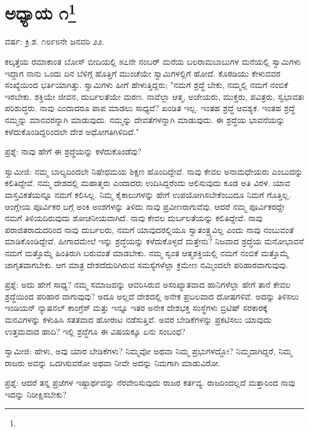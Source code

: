 
\chapter[ಅಧ್ಯಾಯ ೧]{ಅಧ್ಯಾಯ ೧\protect\footnote{}}

\begin{center}
ವರ್ಷ: ಕ್ರಿ.ಶ. ೧೮೯೮ನೇ ಜನವರಿ ೨೨.
\end{center}

ಕಲ್ಕತ್ತೆಯ ರಮಾಕಾಂತ ಬೋಸ್ ಬೀದಿಯಲ್ಲಿ ೫೭ನೇ ನಂಬರ್‌ ಮನೆಯ ಬಲರಾಮಬಾಬುಗಳ ಮನೆಯಲ್ಲಿ ಸ್ವಾಮಿಗಳು ಇದ್ದಾಗ ನಾನು ಒಂದು ದಿನ ಬೆಳಿಗ್ಗೆ ಹೊತ್ತಿಗೆ ಮುಂಚೆಯೇ ಸ್ವಾಮಿಗಳಲ್ಲಿಗೆ ಹೋದೆ. ಕೊಠಡಿಯು ಕೇಳುವವರ ಸಂಖ್ಯೆಯಿಂದ ಭರ್ತಿಯಾಗಿತ್ತು. ಸ್ವಾಮಿಗಳು ಹೀಗೆ ಹೇಳುತ್ತಿದ್ದರು; "ನಮಗೆ ಶ್ರದ್ಧೆ ಬೇಕು, ನಮ್ಮಲ್ಲಿ ನಮಗೆ ನಂಬಿಕೆ ಇರಬೇಕು. ಶಕ್ತಿಯೇ ಜೀವನ, ದುರ್ಬಲತೆಯೇ ಮರಣ. ನಾವೆಲ್ಲಾ ಆತ್ಮ, ಅಜೇಯರು, ಮುಕ್ತರು, ಪವಿತ್ರರು, ಸ್ವಭಾವತಃ ಪರಿಶುದ್ಧರು. ನಾವು ಎಂದಾದರೂ ಪಾಪ ಮಾಡಲು ಸಾಧ್ಯವೆ? ಖಂಡಿತ ಇಲ್ಲ. ಇಂತಹ ಶ್ರದ್ಧೆ ಆವಶ್ಯಕ. ಇಂತಹ ಶ್ರದ್ಧೆ ನಮ್ಮನ್ನು ಮಾನವರನ್ನಾಗಿ ಮಾಡುವುದು. ನಮ್ಮನ್ನು ದೇವತೆಗಳನ್ನಾಗಿ ಮಾಡುವುದು. ಈ ಶ್ರದ್ಧೆಯ ಭಾವನೆಯನ್ನು ಕಳೆದುಕೊಂಡಿದ್ದರಿಂದಲೇ ದೇಶ ಅಧೋಗತಿಗಿಳಿದಿದೆ."

ಪ್ರಶ್ನೆ: ನಾವು ಹೇಗೆ ಈ ಶ್ರದ್ಧೆಯನ್ನು ಕಳೆದುಕೊಂಡೆವು?

ಸ್ವಾಮೀಜಿ: ನಮ್ಮ ಬಾಲ್ಯದಿಂದಲೇ ನಿಷೇಧಮಯ ಶಿಕ್ಷಣ ಹೊಂದಿದ್ದೇವೆ. ನಾವು ಕೇವಲ ಅನಾಮಧೇಯರು ಎಂಬುದನ್ನು ಕಲಿತಿದ್ದೇವೆ. ನಮ್ಮ ದೇಶದಲ್ಲಿ ಮಹಾತ್ಮರು ಎಂದಾದರು ಉದಿಸಿದ್ದರೆಂದು ಆಲಿಸುವುದು ಕೂಡ ಅತಿ ವಿರಳ. ಯಾವ ವಾಸ್ತವಿಕತೆಯನ್ನೂ ನಮಗೆ ಕಲಿಸಿಲ್ಲ. ನಿಮ್ಮ ಕೈಕಾಲುಗಳನ್ನು ಹೇಗೆ ಉಪಯೋಗಿಸಬೇಕೆಂಬುದೂ ನಿಮಗೆ ಗೊತ್ತಿಲ್ಲ. ಆಂಗ್ಲೇಯ ಪೂರ್ವಿಕರ ಬಗ್ಗೆ ಅಂಕಿ ಅಂಶಗಳನ್ನು ತಿಳಿದು ನಾವು ಪ್ರವೀಣರಾಗುವೆವು. ಆದರೆ ನಮ್ಮ ಪೂರ್ವಿಕರದ್ದೇ ನಮಗೆ ತಿಳಿಯದಿರುವುದು ಶೋಚನೀಯವಾಗಿದೆ. ನಾವು ಕೇವಲ ದುರ್ಬಲತೆಯನ್ನು ಕಲಿತಿದ್ದೇವೆ. ನಾವು ಪರಾಜಿತರಾದುದರಿಂದ ನಾವು ದುರ್ಬಲರು, ನಮಗೆ ಯಾವುದರಲ್ಲಿಯೂ ಸ್ವಾತಂತ್ರ್ಯವಿಲ್ಲ ಎಂದು ನಾವು ನಂಬುವಂತೆ ಮಾಡಿಕೊಂಡಿದ್ದೇವೆ. ಹೀಗಾದಮೇಲೆ ಇನ್ನು ಶ್ರದ್ಧೆಯನ್ನು ಕಳೆದುಕೊಳ್ಳದೆ ಮತ್ತೇನು? ನಿಜವಾದ ಶ್ರದ್ಧೆಯ ಮನೋಭಾವನೆ ನಮಗೆ ಮತ್ತೊಮ್ಮೆ ಹಿಂತಿರುಗಿ ಬರುವಂತೆ ಮಾಡಬೇಕು. ನಮ್ಮ ಸ್ವಂತ ಆತ್ಮಶಕ್ತಿಯಲ್ಲಿ ನಮಗೆ ನಂಬಿಕೆ ಮತ್ತೊಮ್ಮೆ ಜಾಗೃತವಾಗಬೇಕು. ಆಗ ಮಾತ್ರ ದೇಶದೆದುರಿಗಿರುವ ಸಮಸ್ಯೆಗಳೆಲ್ಲಾ ಕ್ರಮೇಣ ನಮ್ಮಿಂದಲೇ ಪರಿಹಾರವಾಗುವುವು.

ಪ್ರಶ್ನೆ: ಅದು ಹೇಗೆ ಸಾಧ್ಯ? ನಮ್ಮ ಸಮಾಜವನ್ನು ಆವರಿಸಿರುವ ಅಸಂಖ್ಯಾತವಾದ ಹಾನಿಗಳೆಲ್ಲಾ ಹೇಗೆ ತಾನೆ ಕೇವಲ ಶ್ರದ್ಧೆಯಿಂದ ಪರಿಹಾರ ವಾಗುವುವು? ಅದೂ ಅಲ್ಲದೆ ದೇಶದಲ್ಲಿ ಅನೇಕ ಪ್ರಬಲವಾದ ದೋಷಗಳಿವೆ. ಅದನ್ನು ತಿಳಿಸಲು ಇಂಡಿಯನ್ ನ್ಯಾಷನಲ್ ಕಾಂಗ್ರೆಸ್ ಮತ್ತು ಇನ್ನೂ ಇತರ ಅನೇಕ ದೇಶಭಕ್ತ ಸಂಸ್ಥೆಗಳು ಬ್ರಿಟಿಷ್ ಸರಕಾರಕ್ಕೆ ಮನವಿಗಳನ್ನು ಕಳುಹಿಸಿ ಸತತವಾದ ಹೋರಾಟ ನಡೆಸುತ್ತಿವೆ. ಅವರ ಬೇಡಿಕೆಗಳನ್ನು ಪ್ರಕಟಿಸಲು ಯಾವುದು ಉತ್ತಮವಾದ ಹಾದಿ? ಇಲ್ಲಿ ಶ್ರದ್ಧೆಗೂ ಈ ವಿಷಯಕ್ಕೂ ಏನು ಸಂಬಂಧ?

ಸ್ವಾಮೀಜಿ: ಹೇಳು, ಅವು ಯಾರ ಬೇಡಿಕೆಗಳು? ನಿಮ್ಮವೋ ಅಥವಾ ನಿಮ್ಮ ಪ್ರಭುಗಳದ್ದೋ? ನಿಮ್ಮದಾಗಿದ್ದರೆ, ನಿಮ್ಮ ರಾಜರು ಅವನ್ನು ಒದಗಿಸುವರೋ ಅಥವಾ ನೀವೇ ಅದನ್ನು ನಿಮಗಾಗಿ ಮಾಡುವಿರೋ.

ಪ್ರಶ್ನೆ: ಆದರೆ ತನ್ನ ಪ್ರಜೆಗಳ ಇಷ್ಟಾರ್ಥವನ್ನು ನೆರವೇರಿಸುವುದು ರಾಜರ ಕರ್ತವ್ಯ. ರಾಜರಿಂದಲ್ಲದೆ ಮತ್ತಾರಿಂದ ನಾವು ಇದನ್ನು ನಿರೀಕ್ಷಿಸಬೇಕು?

